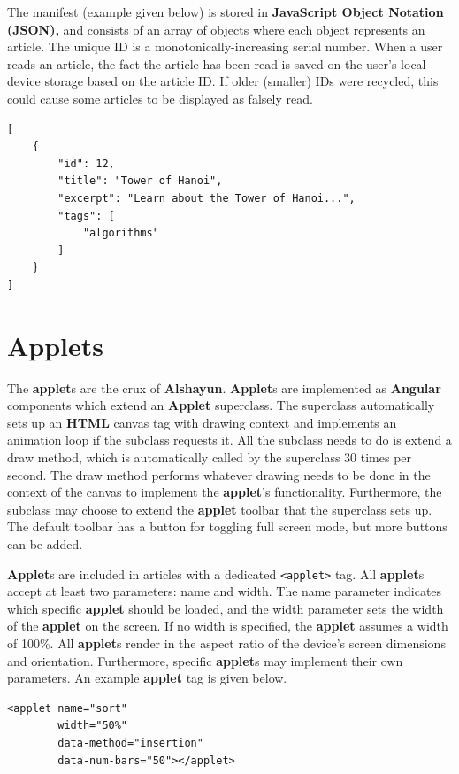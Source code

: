 \documentclass[12pt]{report}
\begin{document}
The manifest (example given below) is stored in \textbf{JavaScript Object
Notation (JSON),} and consists of an array of objects where each object
represents an article. The unique ID is a monotonically-increasing serial
number. When a user reads an article, the fact the article has been read is
saved on the user's local device storage based on the article ID. If older
(smaller) IDs were recycled, this could cause some articles to be displayed as
falsely read.

\begin{verbatim}
[
    {
        "id": 12,
        "title": "Tower of Hanoi",
        "excerpt": "Learn about the Tower of Hanoi...",
        "tags": [
            "algorithms"
        ]
    }
]
\end{verbatim}

    \section{Applets}

The \textbf{applet}s are the crux of \textbf{Alshayun}. \textbf{Applet}s are
implemented as \textbf{Angular} components which extend an \textbf{Applet}
superclass. The superclass automatically sets up an \textbf{HTML} canvas tag
with drawing context and implements an animation loop if the subclass requests
it. All the subclass needs to do is extend a draw method, which is automatically
called by the superclass 30 times per second. The draw method performs whatever
drawing needs to be done in the context of the canvas to implement the
\textbf{applet}'s functionality. Furthermore, the subclass may choose to extend
the \textbf{applet} toolbar that the superclass sets up. The default toolbar has
a button for toggling full screen mode, but more buttons can be added.

\textbf{Applet}s are included in articles with a dedicated \texttt{<applet>}
tag. All \textbf{applet}s accept at least two parameters: name and width. The
name parameter indicates which specific \textbf{applet} should be loaded, and
the width parameter sets the width of the \textbf{applet} on the screen. If no
width is specified, the \textbf{applet} assumes a width of 100\%. All
\textbf{applet}s render in the aspect ratio of the device's screen dimensions
and orientation. Furthermore, specific \textbf{applet}s may implement their own
parameters. An example \textbf{applet} tag is given below.

\begin{verbatim}
<applet name="sort"
        width="50%"
        data-method="insertion"
        data-num-bars="50"></applet>
\end{verbatim}
\end{document}
